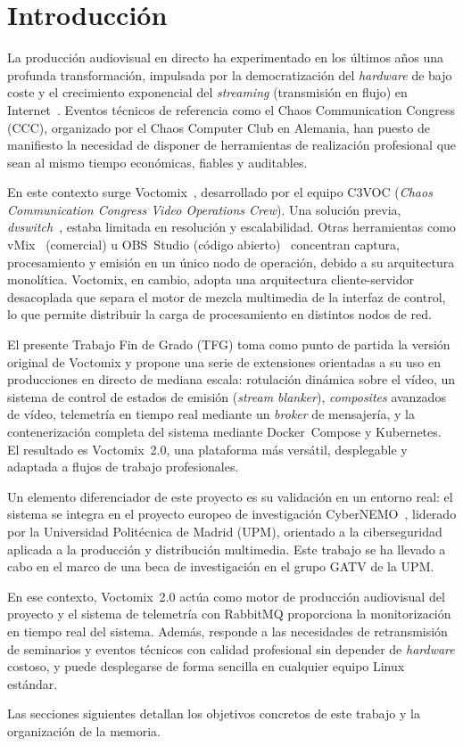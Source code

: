 \section{Introducción}

La producción audiovisual en directo ha experimentado en los últimos años una profunda
transformación, impulsada por la democratización del \textit{hardware} de bajo coste y el
crecimiento exponencial del \textit{streaming} (transmisión en flujo) en Internet~\cite{ericsson_mobility_2024}. Eventos técnicos de referencia como
el Chaos Communication Congress (CCC), organizado por el Chaos Computer Club en Alemania,
han puesto de manifiesto la necesidad de disponer de herramientas de realización
profesional que sean al mismo tiempo económicas, fiables y auditables.

En este contexto surge Voctomix~\cite{voctomix_github,delRio2025ugc}, desarrollado por el equipo C3VOC (\textit{Chaos Communication
Congress Video Operations Crew}). Una solución previa, \textit{dvswitch}~\cite{dvswitch_project}, estaba limitada en
resolución y escalabilidad. Otras herramientas como vMix~\cite{vmix_software} (comercial)
u \ac{OBS}~Studio (código abierto)~\cite{obs_studio} concentran captura, procesamiento
y emisión en un único nodo de operación, debido a su arquitectura monolítica. Voctomix,
en cambio, adopta una arquitectura cliente-servidor desacoplada que separa el motor de
mezcla multimedia de la interfaz de control, lo que permite distribuir la carga de
procesamiento en distintos nodos de red.

El presente Trabajo Fin de Grado (TFG) toma como punto de partida la versión original
de Voctomix y propone una serie de extensiones orientadas a su uso en producciones
en directo de mediana escala: rotulación dinámica sobre el vídeo, un sistema de control de estados de emisión
(\textit{stream blanker}), \textit{composites} avanzados de vídeo, telemetría en tiempo real
mediante un \textit{broker} de mensajería, y la contenerización completa del sistema mediante
Docker~Compose y Kubernetes. El resultado es Voctomix~2.0, una plataforma más versátil,
desplegable y adaptada a flujos de trabajo profesionales.

Un elemento diferenciador de este proyecto es su validación en un entorno real:
el sistema se integra en el proyecto europeo de investigación CyberNEMO~\cite{cybernemo_cordis},
liderado por la Universidad Politécnica de Madrid (UPM), orientado a la ciberseguridad
aplicada a la producción y distribución multimedia. Este trabajo se ha llevado a cabo en el marco de una beca de investigación
en el grupo GATV de la UPM.

En ese contexto, Voctomix~2.0 actúa como motor de producción audiovisual del proyecto
y el sistema de telemetría con RabbitMQ proporciona la monitorización en tiempo real
del sistema. Además, responde a las necesidades de retransmisión de seminarios y
eventos técnicos con calidad profesional sin depender de \textit{hardware} costoso, y puede
desplegarse de forma sencilla en cualquier equipo Linux estándar.

Las secciones siguientes detallan los objetivos concretos de este trabajo y la organización de la memoria.

